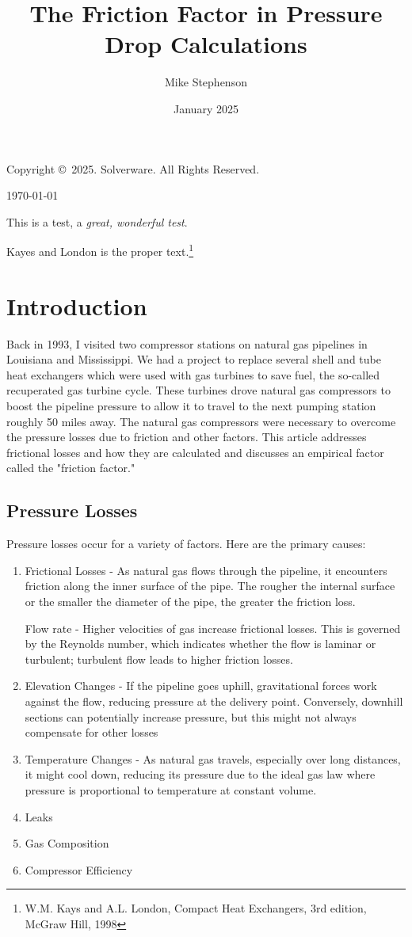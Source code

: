 \documentclass{article}
\title{The Friction Factor in Pressure Drop Calculations}
\author{Mike Stephenson}
\date{January 2025}
\begin{document}
	
	\maketitle
	Copyright \copyright \ 2025. Solverware. All Rights Reserved.
	
	\today
	
	This is a test, a {\em great, wonderful test}.
	
	Kayes and London is the proper text.\footnote{W.M. Kays and A.L. London, Compact Heat Exchangers, 3rd edition, McGraw Hill, 1998}
	
	\section{Introduction}
	Back in 1993, I visited two compressor stations on natural gas pipelines in Louisiana and Mississippi. We had a project to replace several shell and tube heat exchangers which were used with gas turbines to save fuel, the so-called recuperated gas turbine cycle. These turbines drove natural gas compressors to boost the pipeline pressure to allow it to travel to the next pumping station roughly 50 miles away. The natural gas compressors were necessary to overcome the pressure losses due to friction and other factors. This article addresses frictional losses and how they are calculated and discusses an empirical factor called the "friction factor."
	
	\subsection{Pressure Losses}
	Pressure losses occur for a variety of factors. Here are the primary causes:
	\begin{enumerate}[label=(\roman*)]
		\item Frictional Losses -  As natural gas flows through the pipeline, it encounters friction along the inner surface of the pipe. The rougher the internal surface or the smaller the diameter of the pipe, the greater the friction loss.
		
		Flow rate - Higher velocities of gas increase frictional losses. This is governed by the Reynolds number, which indicates whether the flow is laminar or turbulent; turbulent flow leads to higher friction losses.
		\item Elevation Changes  - If the pipeline goes uphill, gravitational forces work against the flow, reducing pressure at the delivery point.  Conversely, downhill sections can potentially increase pressure, but this might not always compensate for other losses
		\item Temperature Changes - As natural gas travels, especially over long distances, it might cool down, reducing its pressure due to the ideal gas law where pressure is proportional to temperature at constant volume.
		\item Leaks
		\item Gas Composition
		\item Compressor Efficiency
	\end{enumerate}
	
\end{document}

